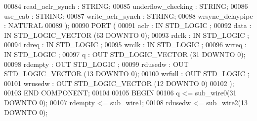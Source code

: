 \begin{DoxyCode}
{00084         read\_aclr\_synch     : \textcolor{comment}{STRING};
00085         underflow\_checking      : \textcolor{comment}{STRING};
00086         use\_eab     : \textcolor{comment}{STRING};
00087         write\_aclr\_synch        : \textcolor{comment}{STRING};
00088         wrsync\_delaypipe        : \textcolor{comment}{NATURAL}
00089     );
00090     \textcolor{keywordflow}{PORT} (
00091             aclr    : \textcolor{keywordflow}{IN} \textcolor{comment}{STD\_LOGIC} ;
00092             data    : \textcolor{keywordflow}{IN} \textcolor{comment}{STD\_LOGIC\_VECTOR} (\textcolor{vhdllogic}{}\textcolor{vhdllogic}{63} \textcolor{keywordflow}{DOWNTO} \textcolor{vhdllogic}{}\textcolor{vhdllogic}{0});
00093             rdclk   : \textcolor{keywordflow}{IN} \textcolor{comment}{STD\_LOGIC} ;
00094             rdreq   : \textcolor{keywordflow}{IN} \textcolor{comment}{STD\_LOGIC} ;
00095             wrclk   : \textcolor{keywordflow}{IN} \textcolor{comment}{STD\_LOGIC} ;
00096             wrreq   : \textcolor{keywordflow}{IN} \textcolor{comment}{STD\_LOGIC} ;
00097             q   : \textcolor{keywordflow}{OUT} \textcolor{comment}{STD\_LOGIC\_VECTOR} (\textcolor{vhdllogic}{}\textcolor{vhdllogic}{31} \textcolor{keywordflow}{DOWNTO} \textcolor{vhdllogic}{}\textcolor{vhdllogic}{0});
00098             rdempty : \textcolor{keywordflow}{OUT} \textcolor{comment}{STD\_LOGIC} ;
00099             rdusedw : \textcolor{keywordflow}{OUT} \textcolor{comment}{STD\_LOGIC\_VECTOR} (\textcolor{vhdllogic}{}\textcolor{vhdllogic}{13} \textcolor{keywordflow}{DOWNTO} \textcolor{vhdllogic}{}\textcolor{vhdllogic}{0});
00100             wrfull  : \textcolor{keywordflow}{OUT} \textcolor{comment}{STD\_LOGIC} ;
00101             wrusedw : \textcolor{keywordflow}{OUT} \textcolor{comment}{STD\_LOGIC\_VECTOR} (\textcolor{vhdllogic}{}\textcolor{vhdllogic}{12} \textcolor{keywordflow}{DOWNTO} \textcolor{vhdllogic}{}\textcolor{vhdllogic}{0})
00102     );
00103     \textcolor{keywordflow}{END} \textcolor{keywordflow}{COMPONENT};
00104 
00105 \textcolor{vhdlkeyword}{BEGIN}
00106     \textcolor{vhdlchar}{q}    \textcolor{vhdlchar}{<=} \textcolor{vhdlchar}{sub_wire0}\textcolor{vhdlchar}{(}\textcolor{vhdllogic}{}\textcolor{vhdllogic}{31} \textcolor{keywordflow}{DOWNTO} \textcolor{vhdllogic}{}\textcolor{vhdllogic}{0}\textcolor{vhdlchar}{)};
00107     \textcolor{vhdlchar}{rdempty}    \textcolor{vhdlchar}{<=} \textcolor{vhdlchar}{sub_wire1};
00108     \textcolor{vhdlchar}{rdusedw}    \textcolor{vhdlchar}{<=} \textcolor{vhdlchar}{sub_wire2}\textcolor{vhdlchar}{(}\textcolor{vhdllogic}{}\textcolor{vhdllogic}{13} \textcolor{keywordflow}{DOWNTO} \textcolor{vhdllogic}{}\textcolor{vhdllogic}{0}\textcolor{vhdlchar}{)};
}
\end{DoxyCode}
